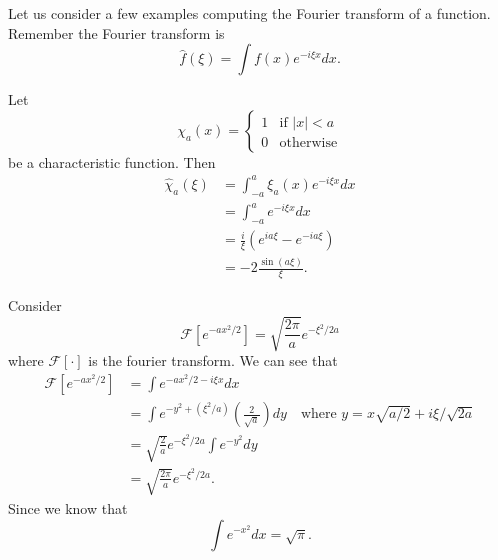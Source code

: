 
Let us consider a few examples computing the Fourier
transform of a function. Remember the Fourier transform is
\begin{equation}
\widehat{f}(\xi) = \int f(x)e^{-i\xi x}dx.
\end{equation}

\begin{ex}
Let
\begin{equation}
\chi_a(x) = \begin{cases} 1 & \text{if }|x|<a\\
0 & \text{otherwise}\end{cases}
\end{equation}
be a characteristic function. Then
\begin{subequations}
\begin{align}
\widehat{\chi}_{a}(\xi) &= \int^{a}_{-a}\xi_{a}(x)e^{-i\xi
  x}dx\\
&= \int^{a}_{-a}e^{-i\xi x}dx\\
&= \frac{i}{\xi}(e^{ia\xi}-e^{-ia\xi})\\
&= -2\frac{\sin(a\xi)}{\xi}.
\end{align}
\end{subequations}
\end{ex}
\begin{ex}
Consider
\begin{equation}
\mathcal{F}\left[e^{-ax^{2}/2}\right] = \sqrt{\frac{2\pi}{a}}e^{-\xi^{2}/2a}
\end{equation}
where $\mathcal{F}[\cdot]$ is the fourier transform. We can
see that
\begin{subequations}
\begin{align}
\mathcal{F}\left[e^{-ax^{2}/2}\right] &= \int
e^{-ax^{2}/2-i\xi x}dx\\
&=\int e^{-y^2+(\xi^{2}/a)}\left(\frac{2}{\sqrt{a}}\right)dy \quad\text{where } y=x\sqrt{a/2}+i\xi/\sqrt{2a}\\
&=\sqrt{\frac{2}{a}}e^{-\xi^{2}/2a}\int e^{-y^2}dy\\
&=\sqrt{\frac{2\pi}{a}}e^{-\xi^{2}/2a}.
\end{align}
\end{subequations}
Since we know that 
\begin{equation}
\int e^{-x^2}dx = \sqrt{\pi}.
\end{equation}
\end{ex}

